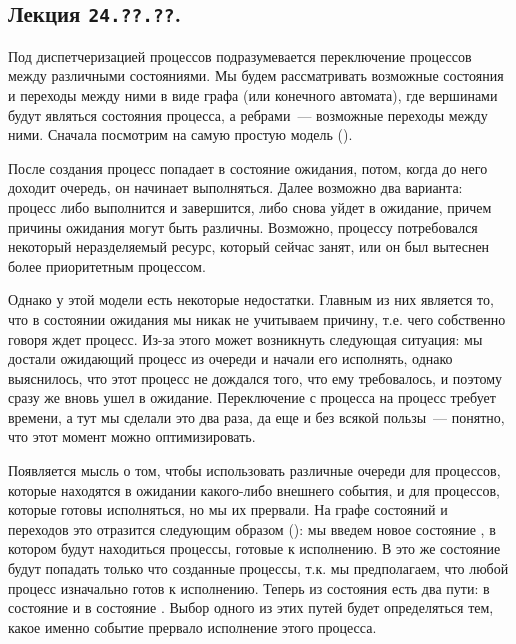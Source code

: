 \subsection{%
  Лекция \texttt{24.??.??}.%
}


Под диспетчеризацией процессов подразумевается переключение процессов между
различными состояниями. Мы будем рассматривать возможные состояния и переходы
между ними в виде графа (или конечного автомата), где вершинами будут являться
состояния процесса, а ребрами~--- возможные переходы между ними. Сначала
посмотрим на самую простую модель ().


После создания процесс попадает в состояние ожидания, потом, когда до него
доходит очередь, он начинает выполняться. Далее возможно два варианта: процесс
либо выполнится и завершится, либо снова уйдет в ожидание, причем причины
ожидания могут быть различны. Возможно, процессу потребовался некоторый
неразделяемый ресурс, который сейчас занят, или он был вытеснен более
приоритетным процессом.

Однако у этой модели есть некоторые недостатки. Главным из них является то, что
в состоянии ожидания мы никак не учитываем причину, т.е. чего собственно говоря
ждет процесс. Из-за этого может возникнуть следующая ситуация: мы достали
ожидающий процесс из очереди и начали его исполнять, однако выяснилось, что этот
процесс не дождался того, что ему требовалось, и поэтому сразу же вновь ушел в
ожидание. Переключение с процесса на процесс требует времени, а тут мы сделали
это два раза, да еще и без всякой пользы~--- понятно, что этот момент можно
оптимизировать.

Появляется мысль о том, чтобы использовать различные очереди для процессов,
которые находятся в ожидании какого-либо внешнего события, и для процессов,
которые готовы исполняться, но мы их прервали. На графе состояний и переходов
это отразится следующим образом (): мы введем новое состояние
, в котором будут находиться процессы, готовые к исполнению. В это
же состояние будут попадать только что созданные процессы, т.к. мы предполагаем,
что любой процесс изначально готов к исполнению. Теперь из состояния
 есть два пути: в состояние  и в состояние
. Выбор одного из этих путей будет определяться тем, какое именно
событие прервало исполнение этого процесса.

